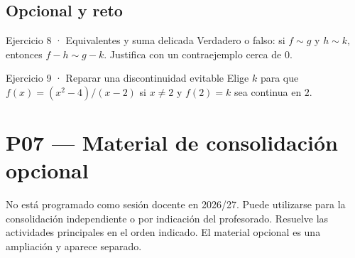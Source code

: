 \documentclass[10pt,a4paper,oneside,openany]{book}
\begin{document}
\section*{Opcional y reto}
\begin{PSevenOptionalFixed}{Ejercicio 8 · Equivalentes y suma delicada}
Verdadero o falso: si \(f\sim g\) y \(h\sim k,\) entonces \(f-h\sim g-k\). Justifica con un contraejemplo cerca de \(0\).
\end{PSevenOptionalFixed}
\begin{PSevenOptionalFixed}{Ejercicio 9 · Reparar una discontinuidad evitable}
Elige \(k\) para que \(f(x)=(x^{2}-4)/(x-2)\) si \(x\ne 2\) y \(f(2)=k\) sea continua en \(2\).
\end{PSevenOptionalFixed}
\chapter{P07 — Material de consolidación opcional}
No está programado como sesión docente en 2026/27. Puede utilizarse para la consolidación independiente o por indicación del profesorado.
Resuelve las actividades principales en el orden indicado. El material opcional es una ampliación y aparece separado.
\end{document}
